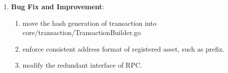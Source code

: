 \begin{enumerate}
\item {\bf Bug Fix and Improvement}:
\begin{enumerate}
\item  move the hash generation of transaction into core/transaction/TransactionBuilder.go
\item  enforce consistent address format of registered asset, such as prefix.
\item modify the redundant interface of RPC. 
\end{enumerate}


\end{enumerate}


\clearpage
